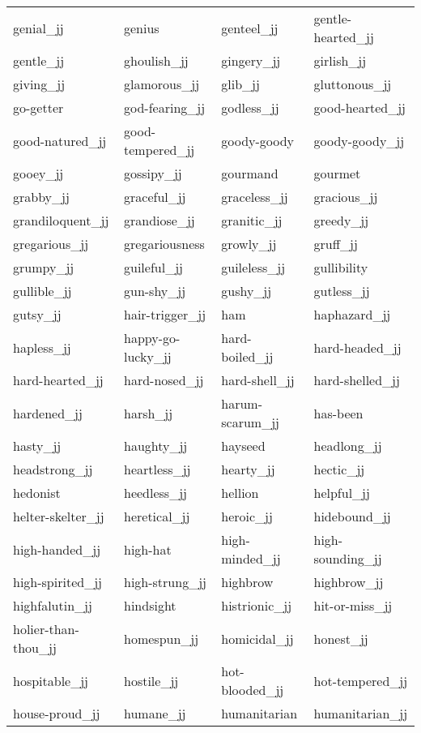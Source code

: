 \begin{longtable}[!htbp]{| llll |}
   genial\_jj & genius & genteel\_jj & gentle-hearted\_jj \\
   gentle\_jj & ghoulish\_jj & gingery\_jj & girlish\_jj \\
   giving\_jj & glamorous\_jj & glib\_jj & gluttonous\_jj \\
   go-getter & god-fearing\_jj & godless\_jj & good-hearted\_jj \\
   good-natured\_jj & good-tempered\_jj & goody-goody & goody-goody\_jj \\
   gooey\_jj & gossipy\_jj & gourmand & gourmet \\
   grabby\_jj & graceful\_jj & graceless\_jj & gracious\_jj \\
   grandiloquent\_jj & grandiose\_jj & granitic\_jj & greedy\_jj \\
   gregarious\_jj & gregariousness & growly\_jj & gruff\_jj \\
   grumpy\_jj & guileful\_jj & guileless\_jj & gullibility \\
   gullible\_jj & gun-shy\_jj & gushy\_jj & gutless\_jj \\
   gutsy\_jj & hair-trigger\_jj & ham & haphazard\_jj \\
   hapless\_jj & happy-go-lucky\_jj & hard-boiled\_jj & hard-headed\_jj \\
   hard-hearted\_jj & hard-nosed\_jj & hard-shell\_jj & hard-shelled\_jj \\
   hardened\_jj & harsh\_jj & harum-scarum\_jj & has-been \\
   hasty\_jj & haughty\_jj & hayseed & headlong\_jj \\
   headstrong\_jj & heartless\_jj & hearty\_jj & hectic\_jj \\
   hedonist & heedless\_jj & hellion & helpful\_jj \\
   helter-skelter\_jj & heretical\_jj & heroic\_jj & hidebound\_jj \\
   high-handed\_jj & high-hat & high-minded\_jj & high-sounding\_jj \\
   high-spirited\_jj & high-strung\_jj & highbrow & highbrow\_jj \\
   highfalutin\_jj & hindsight & histrionic\_jj & hit-or-miss\_jj \\
   holier-than-thou\_jj & homespun\_jj & homicidal\_jj & honest\_jj \\
   hospitable\_jj & hostile\_jj & hot-blooded\_jj & hot-tempered\_jj \\
   house-proud\_jj & humane\_jj & humanitarian & humanitarian\_jj \\

\end{longtable}
